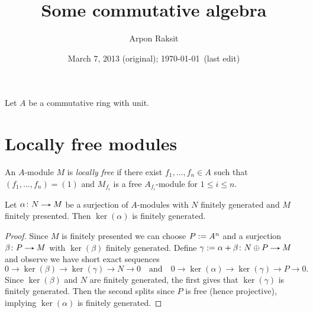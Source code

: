 



\title{Some commutative algebra}
\author{Arpon Raksit}
\date{March 7, 2013 (original); \today\ (last edit)}


\maketitle
\thispagestyle{fancy}


\begin{notation-nonum}
  Let $A$ be a commutative ring with unit.
\end{notation-nonum}


\section{Locally free modules}

\begin{definition}
  \label{locfree}
  An $A$-module $M$ is \emph{locally free} if there exist
  $f_1,\ldots,f_n \in A$ such that $(f_1,\ldots,f_n) = (1)$ and
  $M_{f_i}$ is a free $A_{f_i}$-module for $1 \le i \le n$.
\end{definition}

\begin{lemma}
  \label{finpres-ker}
  Let $\alpha \c N \to M$ be a surjection of $A$-modules with $N$
  finitely generated and $M$ finitely presented. Then $\ker(\alpha)$
  is finitely generated.
\end{lemma}

\begin{proof}
  Since $M$ is finitely presented we can choose $P \mathrel{:=} A^n$ and a
  surjection $\beta \c P \to M$ with $\ker(\beta)$ finitely
  generated. Define $\gamma \ce \alpha + \beta \c N \oplus P \to M$
  and observe we have short exact sequences
  \[
  0 \to \ker(\beta) \to \ker(\gamma) \to N \to 0
  \quad\text{and}\quad
  0 \to \ker(\alpha) \to \ker(\gamma) \to P \to 0.
  \]
  Since $\ker(\beta)$ and $N$ are finitely generated, the first gives
  that $\ker(\gamma)$ is finitely generated. Then the second splits
  since $P$ is free (hence projective), implying $\ker(\alpha)$ is
  finitely generated.
\end{proof}

